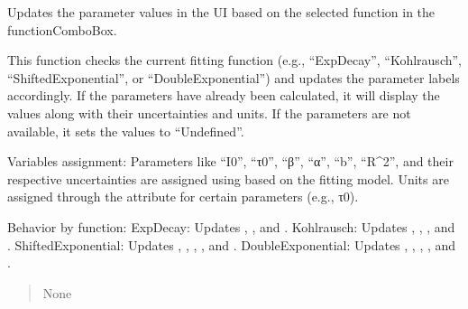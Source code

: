 \documentclass[letterpaper,10pt,english]{sphinxmanual}
\begin{document}
\begin{fulllineitems}
\begin{fulllineitems}
\begin{quote}
\begin{description}
\end{description}\end{quote}

\end{fulllineitems}


\begin{fulllineitems}
\label{\detokenize{FLIMGraphics:FLIMGraphics.FLIMGraphic.changeFunction}}
\pysigstartsignatures
{}
\pysigstopsignatures
\sphinxAtStartPar
Updates the parameter values in the UI based on the selected function in the functionComboBox.

\sphinxAtStartPar
This function checks the current fitting function (e.g., “ExpDecay”, “Kohlrausch”, “ShiftedExponential”, or 
“DoubleExponential”) and updates the parameter labels accordingly. If the parameters have already been calculated,
it will display the values along with their uncertainties and units. If the parameters are not available, it sets 
the values to “Undefined”.

\sphinxAtStartPar
Variables assignment:
\sphinxhyphen{} Parameters like “I0”, “τ0”, “β”, “α”, “b”, “R\textasciicircum{}2”, and their respective uncertainties are assigned using 
 based on the fitting model.
\sphinxhyphen{} Units are assigned through the  attribute for certain parameters (e.g., τ0).

\sphinxAtStartPar
Behavior by function:
\sphinxhyphen{} ExpDecay: Updates , , and .
\sphinxhyphen{} Kohlrausch: Updates , , , and .
\sphinxhyphen{} ShiftedExponential: Updates , , , , and .
\sphinxhyphen{} DoubleExponential: Updates , , , , and .
\begin{quote}\begin{description}
\sphinxAtStartPar
None

\end{description}\end{quote}


\end{fulllineitems}
\end{fulllineitems}
\end{document}
